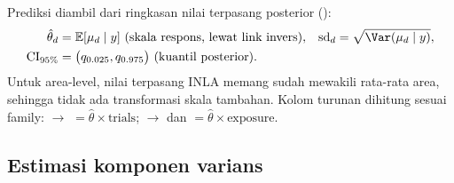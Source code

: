 Prediksi diambil dari ringkasan nilai terpasang posterior ():
\begin{equation}
\begin{aligned}
  \hat\theta_d&=\mathbb E[\mu_d\mid y]\ \text{(skala respons, lewat link invers)},
  & \mathrm{sd}_d&=\sqrt{\Var(\mu_d\mid y)},\\
  \mathrm{CI}_{95\%}&=\bigl(q_{0.025},q_{0.975}\bigr)
    \ \text{(kuantil posterior)}.
\end{aligned}
  \label{eq:hbarea-pred}
\end{equation}
Untuk area-level, nilai terpasang INLA memang sudah mewakili rata-rata area,
sehingga tidak ada transformasi skala tambahan. Kolom turunan
dihitung sesuai family:  $\to$ 
$=\hat\theta\times\text{trials}$;  $\to$  dan
 $=\hat\theta\times\text{exposure}$.


\subsection{Estimasi komponen varians}\label{sec:hbarea-varians}

